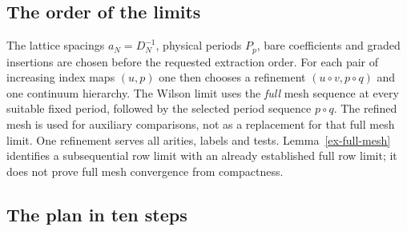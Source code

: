 \subsection{The order of the limits}
\label{ex-outline-limits}

The lattice spacings $a_N=D_N^{-1}$, physical periods $P_p$, bare
coefficients and graded insertions are chosen before the requested
extraction order. For each pair of increasing index maps $(u,p)$ one
then chooses a refinement $(u\circ v,p\circ q)$ and one continuum
hierarchy. The Wilson limit uses the \emph{full} mesh sequence at every
suitable fixed period, followed by the selected period sequence $p\circ q$.
The refined mesh is used for auxiliary comparisons, not as a replacement
for that full mesh limit. One refinement serves all arities, labels and
tests. Lemma~\ref{ex-full-mesh} identifies a subsequential row limit
with an already established full row limit; it does not prove full mesh
convergence from compactness.

\subsection{The plan in ten steps}
\label{ex-outline-plan}

